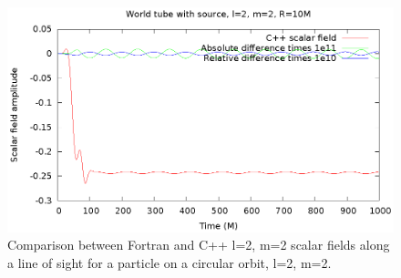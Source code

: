 \begin{figure}
  \includegraphics{wtcircl2m2}
  \caption{Comparison between Fortran and C++ l=2, m=2 scalar fields along a line of sight for a particle on a circular orbit, l=2, m=2.}
  \label{circ4}
\end{figure}
